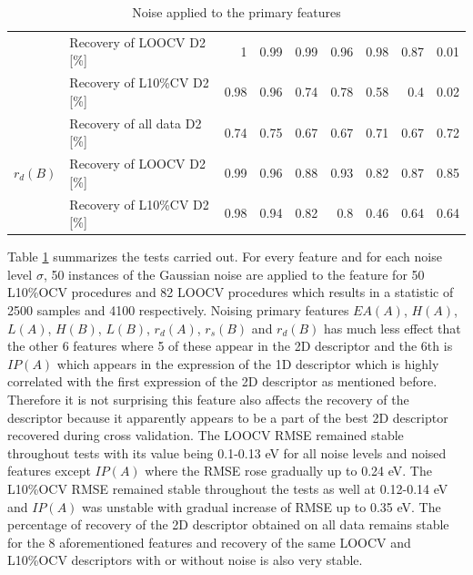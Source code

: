\documentclass[11pt,oneside,czech,american]{book} %
\theoremstyle{plain}
\theoremstyle{definition}
\begin{document}
\begin{table}[H]
\begin{tabular}{llrrrrrrr}
	& Recovery of LOOCV D2 [\%]    & 1             & 0.99          & 0.99          & 0.96         & 0.98          & 0.87          & 0.01           \\
	& Recovery of L10\%CV D2 [\%]  & 0.98          & 0.96          & 0.74          & 0.78         & 0.58          & 0.4           & 0.02           \\ 
	\hline
	\multirow{3}{*}{$r_d(B)$} & Recovery of all data D2 [\%] & 0.74          & 0.75          & 0.67          & 0.67         & 0.71          & 0.67          & 0.72           \\
	& Recovery of LOOCV D2 [\%]    & 0.99          & 0.96          & 0.88          & 0.93         & 0.82          & 0.87          & 0.85           \\
	& Recovery of L10\%CV D2 [\%]  & 0.98          & 0.94          & 0.82          & 0.8          & 0.46          & 0.64          & 0.64           \\
	\hline
\end{tabular}
	\caption{Noise applied to the primary features}
	\label{big}
\end{table}
Table \ref{big} summarizes the tests carried out. For every feature and for each noise level $\sigma$, 50 instances of the Gaussian noise are applied to the feature for 50 L10\%OCV procedures and 82 LOOCV procedures which results in a statistic of 2500 samples and 4100 respectively. Noising primary features $EA(A)$, $H(A)$, $L(A)$, $H(B)$, $L(B)$, $r_d(A)$, $r_s(B)$ and $r_d(B)$ has much less effect that the other 6 features where 5 of these appear in the 2D descriptor and the 6th is $IP(A)$ which appears in the expression of the 1D descriptor which is highly correlated with the first expression of the 2D descriptor as mentioned before. Therefore it is not surprising this feature also affects the recovery of the descriptor because it apparently appears to be a part of the best 2D descriptor recovered during cross validation. 
The LOOCV RMSE remained stable throughout tests with its value being 0.1-0.13 eV for all noise levels and noised features except $IP(A)$ where the RMSE rose gradually up to 0.24 eV. The L10\%OCV RMSE remained stable throughout the tests as well at 0.12-0.14 eV and $IP(A)$ was unstable with gradual increase of RMSE up to 0.35 eV.
The percentage of recovery of the 2D descriptor obtained on all data remains stable for the 8 aforementioned features and recovery of the same LOOCV and L10\%OCV descriptors with or without noise is also very stable.
\end{document}
